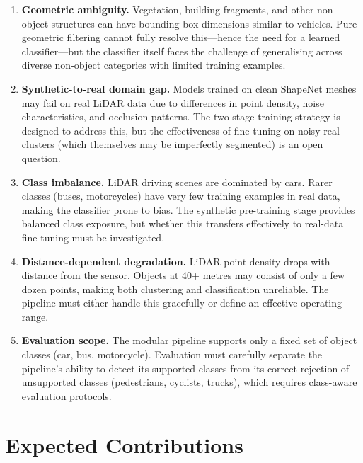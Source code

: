 \documentclass[runningheads]{llncs}
\begin{document}
\begin{enumerate}
    \item \textbf{Geometric ambiguity.} Vegetation, building fragments, and other non-object structures can have bounding-box dimensions similar to vehicles. Pure geometric filtering cannot fully resolve this---hence the need for a learned classifier---but the classifier itself faces the challenge of generalising across diverse non-object categories with limited training examples.

    \item \textbf{Synthetic-to-real domain gap.} Models trained on clean ShapeNet meshes may fail on real LiDAR data due to differences in point density, noise characteristics, and occlusion patterns. The two-stage training strategy is designed to address this, but the effectiveness of fine-tuning on noisy real clusters (which themselves may be imperfectly segmented) is an open question.

    \item \textbf{Class imbalance.} LiDAR driving scenes are dominated by cars. Rarer classes (buses, motorcycles) have very few training examples in real data, making the classifier prone to bias. The synthetic pre-training stage provides balanced class exposure, but whether this transfers effectively to real-data fine-tuning must be investigated.

    \item \textbf{Distance-dependent degradation.} LiDAR point density drops with distance from the sensor. Objects at 40+ metres may consist of only a few dozen points, making both clustering and classification unreliable. The pipeline must either handle this gracefully or define an effective operating range.

    \item \textbf{Evaluation scope.} The modular pipeline supports only a fixed set of object classes (car, bus, motorcycle). Evaluation must carefully separate the pipeline's ability to detect its supported classes from its correct rejection of unsupported classes (pedestrians, cyclists, trucks), which requires class-aware evaluation protocols.
\end{enumerate}


\section{Expected Contributions}
\end{document}
